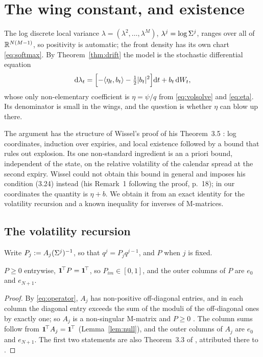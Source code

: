 \section{The wing constant, and existence}\label{sec:exist}

The log discrete local variance $\lambda=(\lambda^2,\dots,\lambda^M)$,
$\lambda^j=\log\Sigma^j$, ranges over all of $\mathbb R^{N(M-1)}$, so positivity is
automatic; the front density has its own chart \eqref{eq:softmax}. By Theorem~\ref{thm:drift} the model
is the stochastic differential equation
\begin{equation}\label{eq:abstract}
  \mathrm d\lambda_t=\Bigl[-\langle \eta_t,b_t\rangle-\tfrac12\lvert b_t\rvert^{2}\Bigr]\mathrm d t
   +b_t\,\mathrm d W_t ,
\end{equation}
whose only non-elementary coefficient is $\eta=\psi/q$ from \eqref{eq:volsolve}
and \eqref{eq:eta}. Its denominator is small in the wings, and the question is
whether $\eta$ can blow up there.

The argument has the structure of Wissel's proof of his Theorem~3.5
\cite{Wissel2007}: log coordinates, induction over expiries, and local existence
followed by a bound that rules out explosion. Its one non-standard ingredient is an a priori bound, independent of the state, on the
relative volatility of the calendar spread at the second expiry. Wissel could not
obtain this bound in general and imposes his condition (3.24) instead (his
Remark~1 following the proof, p.~18); in our coordinates the quantity is $\eta+b$.
We obtain it from an exact identity for the
volatility recursion and a known inequality for inverses of M-matrices.

\subsection{The volatility recursion}\label{sec:walk}\label{sec:master}

Write $P_j:=A_j(\Sigma^j)^{-1}$, so that $q^j=P_jq^{j-1}$, and $P$ when $j$ is fixed.

\begin{corollary}\label{cor:pos}
$P\ge0$ entrywise, $\mathbf 1^{\!\top}P=\mathbf 1^{\!\top}$, so $P_{im}\in[0,1]$, and the outer
columns of $P$ are $e_0$ and $e_{N+1}$.
\end{corollary}

\begin{proof}
By \eqref{eq:operator}, $A_j$ has non-positive off-diagonal entries, and in each
column the diagonal entry exceeds the sum of the moduli of the off-diagonal ones by
exactly one; so $A_j$ is a non-singular M-matrix and $P\ge0$
\cite{BermanPlemmons1994}. The column sums follow from $\mathbf 1^{\!\top}A_j=\mathbf 1^{\!\top}$
(Lemma~\ref{lem:null}), and the outer columns of $A_j$ are $e_0$ and $e_{N+1}$. The
first two statements are also Theorem~3.3 of \cite{BuehlerRyskin2016}, attributed
there to \cite{AndreasenHuge2011}.
\end{proof}

